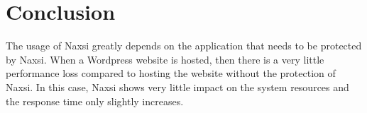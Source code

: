 \documentclass[Conclusion]{subfiles}
\begin{document}
\section{Conclusion}
\label{sec:Conclusion}
The usage of Naxsi greatly depends on the application that needs to be protected by Naxsi. When a Wordpress website is hosted, then there is a very little performance loss compared to hosting the website without the protection of Naxsi. In this case, Naxsi shows very little impact on the system resources and the response time only slightly increases. 
\end{document}
